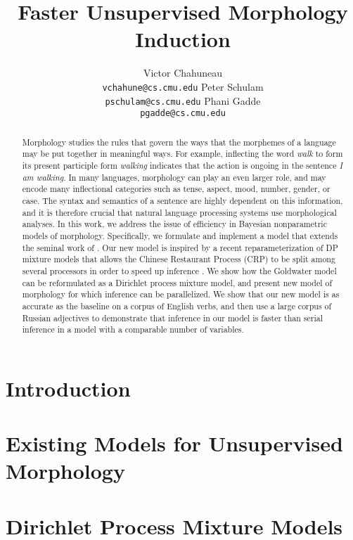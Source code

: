 \documentclass{article}
\title{Faster Unsupervised Morphology Induction}
\author{
Victor Chahuneau\\
\texttt{vchahune@cs.cmu.edu}
\And
Peter Schulam\\
\texttt{pschulam@cs.cmu.edu}
\And
Phani Gadde\\
\texttt{pgadde@cs.cmu.edu} \\
}
\begin{document}
\maketitle

\begin{abstract}
  Morphology studies the rules that govern the ways that the morphemes
  of a language may be put together in meaningful ways. For example,
  inflecting the word \textit{walk} to form its present participle
  form \textit{walking} indicates that the action is ongoing in the
  sentence \textit{I am walking}. In many languages, morphology can
  play an even larger role, and may encode many inflectional
  categories such as tense, aspect, mood, number, gender, or case. The
  syntax and semantics of a sentence are highly dependent on this
  information, and it is therefore crucial that natural language
  processing systems use morphological analyses.  In this work, we
  address the issue of efficiency in Bayesian nonparametric models of
  morphology. Specifically, we formulate and implement a model that
  extends the seminal work of \cite{goldwater2011}. Our new model is
  inspired by a recent reparameterization of DP mixture models that
  allows the Chinese Restaurant Process (CRP) to be split among
  several processors in order to speed up inference
  \cite{williamson2013}. We show how the Goldwater model can be
  reformulated as a Dirichlet process mixture model, and present new
  model of morphology for which inference can be parallelized. We show
  that our new model is as accurate as the baseline on a corpus of
  English verbs, and then use a large corpus of Russian adjectives to
  demonstrate that inference in our model is faster than serial
  inference in a model with a comparable number of variables.
\end{abstract}

\section{Introduction}
\label{sec:introduction}



\section{Existing Models for Unsupervised Morphology}
\label{sec:existing-models}



\section{Dirichlet Process Mixture Models}
\label{sec:dpmm}
\end{document}
